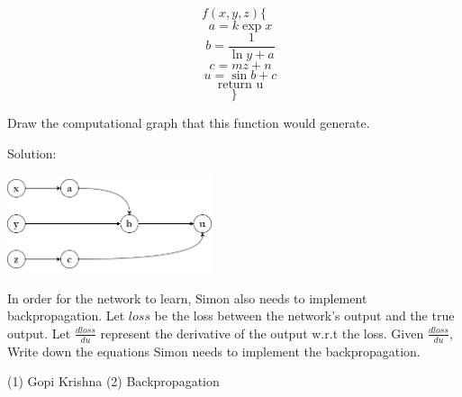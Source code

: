 \begin{parts}
\medskip

$$f(x, y, z) \{$$
$$\quad a = k\exp{x}$$
$$\quad b = \frac{1}{\ln{y} + a}$$
$$\quad c = mz + n$$
$$\quad u = \sin{b} + c$$
$$\quad \text{return u}$$
$$\}$$

\medskip

\begin{subparts}
    \subpart[] Draw the computational graph that this function would generate.
    \begin{tcolorbox}[fit,height=5cm, width=15cm, blank, borderline={1pt}{-2pt}]
    \end{tcolorbox}
    \begin{soln}
        Solution:
        \begin{center}
            \includegraphics[width=6cm]{figures/backprop.png}
        \end{center}
    \end{soln}
    
    \subpart[] In order for the network to learn, Simon also needs to implement backpropagation. Let $loss$ be the loss between the network's output and the true output. Let $\frac{dloss}{du}$ represent the derivative of the output w.r.t the loss. Given $\frac{dloss}{du}$, Write down the equations Simon needs to implement the backpropagation.
    \begin{tcolorbox}[fit,height=5cm, width=15cm, blank, borderline={1pt}{-2pt}]
    \end{tcolorbox}
    \begin{soln}
    \end{soln}
    \begin{qauthor}
        (1) Gopi Krishna (2) Backpropagation
    \end{qauthor}
    
\end{subparts}





\end{parts}
